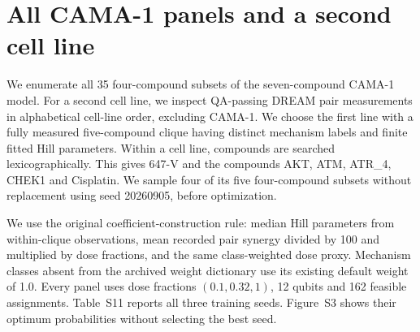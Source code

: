 \clearpage
\section{All CAMA-1 panels and a second cell line}
We enumerate all 35 four-compound subsets of the seven-compound CAMA-1 model. For a second cell line, we inspect QA-passing DREAM pair measurements in alphabetical cell-line order, excluding CAMA-1. We choose the first line with a fully measured five-compound clique having distinct mechanism labels and finite fitted Hill parameters. Within a cell line, compounds are searched lexicographically. This gives 647-V and the compounds AKT, ATM, ATR\_4, CHEK1 and Cisplatin. We sample four of its five four-compound subsets without replacement using seed 20260905, before optimization.

We use the original coefficient-construction rule: median Hill parameters from within-clique observations, mean recorded pair synergy divided by 100 and multiplied by dose fractions, and the same class-weighted dose proxy. Mechanism classes absent from the archived weight dictionary use its existing default weight of 1.0. Every panel uses dose fractions $(0.1,0.32,1)$, 12 qubits and 162 feasible assignments. Table~S11 reports all three training seeds. Figure~S3 shows their optimum probabilities without selecting the best seed.

